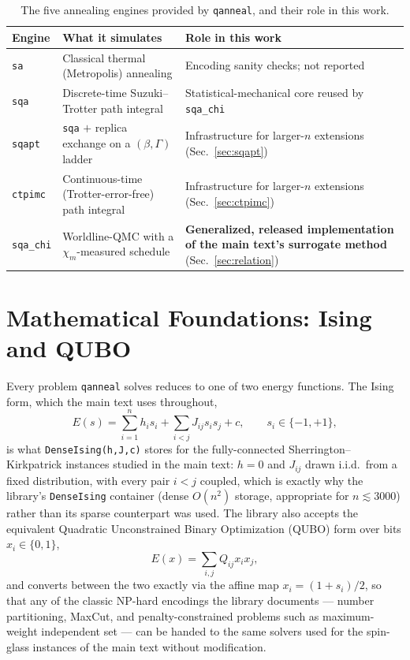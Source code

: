\documentclass[11pt]{article}
\newcommand{\chim}{\chi_{m}}
\begin{document}
\begin{table}[h]
\centering
\caption{The five annealing engines provided by \texttt{qanneal}, and their role in this work.}
\label{tab:engines}
\begin{tabular}{lp{4.6cm}p{4.6cm}}
\toprule
Engine & What it simulates & Role in this work \\
\midrule
\texttt{sa} & Classical thermal (Metropolis) annealing & Encoding sanity checks; not reported \\
\texttt{sqa} & Discrete-time Suzuki--Trotter path integral & Statistical-mechanical core reused by \texttt{sqa\_chi} \\
\texttt{sqapt} & \texttt{sqa} $+$ replica exchange on a $(\beta,\Gamma)$ ladder & Infrastructure for larger-$n$ extensions (Sec.~\ref{sec:sqapt}) \\
\texttt{ctpimc} & Continuous-time (Trotter-error-free) path integral & Infrastructure for larger-$n$ extensions (Sec.~\ref{sec:ctpimc}) \\
\texttt{sqa\_chi} & Worldline-QMC with a $\chim$-measured schedule & \textbf{Generalized, released implementation of the main text's surrogate method} (Sec.~\ref{sec:relation}) \\
\bottomrule
\end{tabular}
\end{table}

\section{Mathematical Foundations: Ising and QUBO}
\label{sec:foundations}

Every problem \texttt{qanneal} solves reduces to one of two energy functions. The Ising form,
which the main text uses throughout,
\begin{equation}
E(s) = \sum_{i=1}^n h_i s_i + \sum_{i<j} J_{ij}s_is_j + c, \qquad s_i\in\{-1,+1\},
\label{eq:ising}
\end{equation}
is what \texttt{DenseIsing(h,J,c)} stores for the fully-connected Sherrington--Kirkpatrick
instances studied in the main text: $h=0$ and $J_{ij}$ drawn i.i.d.\ from a fixed distribution,
with every pair $i<j$ coupled, which is exactly why the library's \texttt{DenseIsing} container
(dense $O(n^2)$ storage, appropriate for $n\lesssim3000$) rather than its sparse counterpart was
used. The library also accepts the equivalent Quadratic Unconstrained Binary Optimization (QUBO)
form over bits $x_i\in\{0,1\}$,
\begin{equation}
E(x) = \sum_{i,j} Q_{ij}x_ix_j,
\label{eq:qubo}
\end{equation}
and converts between the two exactly via the affine map $x_i=(1+s_i)/2$, so that any of the
classic NP-hard encodings the library documents --- number partitioning, MaxCut, and
penalty-constrained problems such as maximum-weight independent set --- can be handed to the
same solvers used for the spin-glass instances of the main text without modification.
\end{document}
